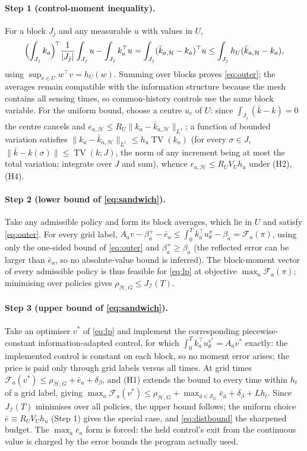 \documentclass[11pt,a4paper]{article}
\theoremstyle{plain}
\theoremstyle{definition}
\theoremstyle{remark}
\newcommand{\calI}{\mathcal{I}}
\newcommand{\calH}{\mathcal{H}}
\newcommand{\calF}{\mathcal{F}}
\newcommand{\calS}{\mathscr{S}}
\newcommand{\J}{J_{\calI}(T)}
\newcommand{\rhoHG}{\rho_{\calH,G}}
\newcommand{\ebar}{\bar{e}}
\DeclareMathOperator{\TV}{TV}
\begin{document}
\paragraph{Step 1 (control-moment inequality).}
For a block $J_j$ and any measurable $u$ with values in $U$,
\[
\Bigl(\int_{J_j}k_a\Bigr)^{\!\top}\frac1{|J_j|}\int_{J_j}u-\int_{J_j}k_a^\top u=\int_{J_j}(\bar k_{a,\calH}-k_a)^\top u\le\int_{J_j}h_U(\bar k_{a,\calH}-k_a),
\]
using $\sup_{v\in U}w^\top v=h_U(w)$. Summing over blocks proves \eqref{eq:outer}; the averages remain compatible with the information structure because the mesh contains all sensing times, so common-history controls use the same block variable. For the uniform bound, choose a centre $u_c$ of $U$: since $\int_{J_j}(\bar k-k)=0$ the centre cancels and $e_{a,\calH}\le R_U\|k_a-\bar k_{a,\calH}\|_{L^1}$; a function of bounded variation satisfies $\|k_a-\bar k_{a,\calH}\|_{L^1}\le h_u\TV(k_a)$ (for every $\sigma\in J$, $\|\bar k-k(\sigma)\|\le\TV(k;J)$, the norm of any increment being at most the total variation; integrate over $J$ and sum), whence $e_{a,\calH}\le R_UV_Uh_u$ under (H2), (H4).

\paragraph{Step 2 (lower bound of \eqref{eq:sandwich}).}
Take any admissible policy and form its block averages, which lie in $U$ and satisfy \eqref{eq:outer}. For every grid label, $A_av-\beta^+_a-\ebar_a\le\int_0^Tk_a^\top u^\pi_\theta-\beta_a=\calF_a(\pi)$, using only the one-sided bound of \eqref{eq:outer} and $\beta^+_a\ge\beta_a$ (the reflected error can be larger than $\ebar_a$, so no absolute-value bound is inferred). The block-moment vector of every admissible policy is thus feasible for \eqref{eq:lp} at objective $\max_a\calF_a(\pi)$; minimising over policies gives $\rhoHG\le\J$.

\paragraph{Step 3 (upper bound of \eqref{eq:sandwich}).}
Take an optimiser $v^\ast$ of \eqref{eq:lp} and implement the corresponding piecewise-constant information-adapted control, for which $\int_0^Tk_a^\top u^{v^\ast}_\theta=A_av^\ast$ exactly: the implemented control is constant on each block, so no moment error arises; the price is paid only through grid labels versus all times. At grid times $\calF_a(v^\ast)\le\rhoHG+\ebar_a+\delta_\beta$, and (H1) extends the bound to every time within $h_t$ of a grid label, giving $\max_a\calF_a(v^\ast)\le\rhoHG+\max_{\hat a\in\calS_G}\ebar_{\hat a}+\delta_\beta+Lh_t$. Since $\J$ minimises over all policies, the upper bound follows; the uniform choice $\ebar\equiv R_UV_Uh_u$ (Step 1) gives the special case, and \eqref{eq:distbound} the sharpened budget. The $\max_a\ebar_a$ form is forced: the held control's exit from the continuous value is charged by the error bounds the program actually used.
\end{document}
